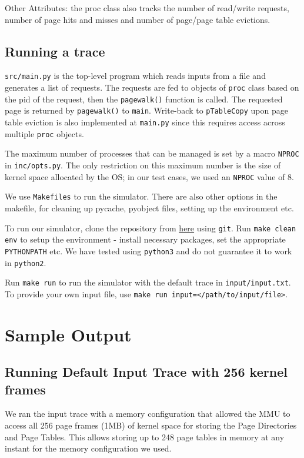 \documentclass[12pt,a4paper,english]{paper}
\begin{document}
\begin{compactitem}
\begin{compactitem}
        \item Other Attributes: the proc class also tracks the number of read/write requests, number of page hits and misses and number of page/page table evictions.
    \end{compactitem}
\end{compactitem}

\subsection {Running a trace}
\texttt{src/main.py} is the top-level program which reads inputs from a file and generates a list of requests. The requests are fed to objects of \texttt{proc} class based on the pid of the request, then the \texttt{pagewalk()} function is called. The requested page is returned by \texttt{pagewalk()} to \texttt{main}. Write-back to \texttt{pTableCopy} upon page table eviction is also implemented at \texttt{main.py} since this requires access across multiple \texttt{proc} objects.

The maximum number of processes that can be managed is set by a macro \texttt{NPROC} in \texttt{inc/opts.py}. The only restriction on this maximum number is the size of kernel space allocated by the OS; in our test cases, we used an \texttt{NPROC} value of 8.

We use \texttt{Makefiles} to run the simulator. There are also other options in the makefile, for cleaning up pycache, pyobject files, setting up the environment etc.

To run our simulator, clone the repository from \href{https://github.com/aklsh/MMU}{here} using \texttt{git}. Run \texttt{make clean env} to setup the environment - install necessary packages, set the appropriate \texttt{PYTHONPATH} etc. We have tested using \texttt{python3} and do not guarantee it to work in \texttt{python2}.

Run \texttt{make run} to run the simulator with the default trace in \texttt{input/input.txt}. To provide your own input file, use \texttt{make run input=</path/to/input/file>}.

\section{Sample Output}
\subsection{Running Default Input Trace with 256 kernel frames}
We ran the input trace with a memory configuration that allowed the MMU to access all 256 page frames (1MB) of kernel space for storing the Page Directories and Page Tables. This allows storing up to 248 page tables in memory at any instant for the memory configuration we used.\\
\end{document}
